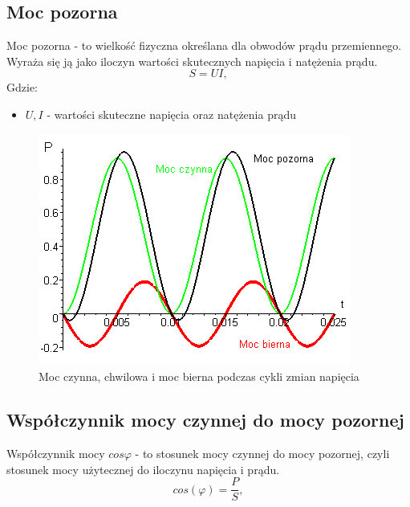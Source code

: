 \documentclass[12pt]{article}
\begin{document}
\subsection{Moc pozorna}
Moc pozorna - to wielkość fizyczna określana dla obwodów prądu przemiennego. Wyraża się ją jako iloczyn wartości skutecznych napięcia i natężenia prądu.
\begin{equation}
    S = UI,
\end{equation}
Gdzie:
\begin{itemize}[noitemsep]
    \item $U, I$ - wartości skuteczne napięcia oraz natężenia prądu
\end{itemize}
\begin{figure}[H]
    \centering
    \includegraphics[scale=0.5]{power_types.png}
    \caption{Moc czynna, chwilowa i moc bierna podczas cykli zmian napięcia}
    \label{fig:my_label}
\end{figure}
\subsection{Współczynnik mocy czynnej do mocy pozornej}
Współczynnik mocy $cos{\varphi}$ - to stosunek mocy czynnej do mocy pozornej, czyli stosunek mocy użytecznej do iloczynu napięcia i prądu.
\begin{equation}
    cos(\varphi) = \frac{P}{S},
\end{equation}
\end{document}

